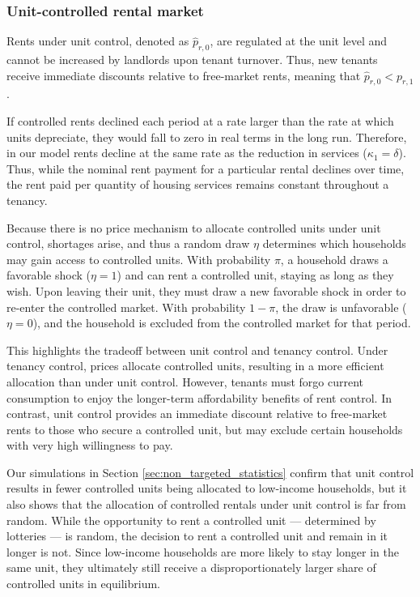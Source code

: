 \documentclass[parskip=full]{article}
\begin{document}
\subsubsection{Unit-controlled rental market}

Rents under unit control, denoted as $\hat{p}_{r,0}$, are regulated at the unit level and cannot be increased by landlords upon tenant turnover. Thus, new tenants receive immediate discounts relative to free-market rents, meaning that $\hat{p}_{r,0}<p_{r,1}$. 

If controlled rents declined each period at a rate larger than the rate at which units depreciate, they would fall to zero in real terms in the long run. Therefore, in our model rents decline at the same rate as the reduction in services ($\kappa_1=\delta$). Thus, while the nominal rent payment for a particular rental declines over time, the rent paid per quantity of housing services remains constant throughout a tenancy. 

Because there is no price mechanism to allocate controlled units under unit control, shortages arise, and thus a random draw $\eta$ determines which households may gain access to controlled units. With probability $\pi$, a household draws a favorable shock ($\eta=1$) and can rent a controlled unit, staying as long as they wish. Upon leaving their unit, they must draw a new favorable shock in order to re-enter the controlled market. With probability $1-\pi$, the draw is unfavorable ($\eta=0$), and the household is excluded from the controlled market for that period. 

This highlights the tradeoff between unit control and tenancy control. Under tenancy control, prices allocate controlled units, resulting in a more efficient allocation than under unit control. However, tenants must forgo current consumption to enjoy the longer-term affordability benefits of rent control. In contrast, unit control provides an immediate discount relative to free-market rents to those who secure a controlled unit, but may exclude certain households with very high willingness to pay. 

Our simulations in Section \ref{sec:non_targeted_statistics} confirm that unit control results in fewer controlled units being allocated to low-income households, but it also shows that the allocation of controlled rentals under unit control is far from random. While the opportunity to rent a controlled unit — determined by lotteries — is random, the decision to rent a controlled unit and remain in it longer is not. Since low-income households are more likely to stay longer in the same unit, they ultimately still receive a disproportionately larger share of controlled units in equilibrium.
\end{document}
